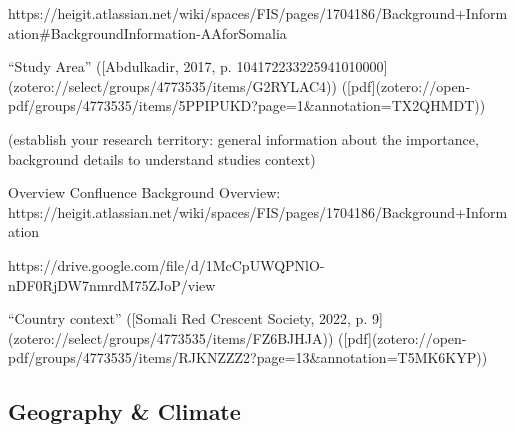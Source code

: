 {%

https://heigit.atlassian.net/wiki/spaces/FIS/pages/1704186/Background+Information#BackgroundInformation-AAforSomalia

“Study Area” ([Abdulkadir, 2017, p. 104172233225941010000](zotero://select/groups/4773535/items/G2RYLAC4)) ([pdf](zotero://open-pdf/groups/4773535/items/5PPIPUKD?page=1&annotation=TX2QHMDT))

(establish your research territory: general information about the importance, background details to understand studies context)

Overview Confluence Background Overview:
https://heigit.atlassian.net/wiki/spaces/FIS/pages/1704186/Background+Information

https://drive.google.com/file/d/1McCpUWQPNlO-nDF0RjDW7nmrdM75ZJoP/view

“Country context” ([Somali Red Crescent Society, 2022, p. 9](zotero://select/groups/4773535/items/FZ6BJHJA)) ([pdf](zotero://open-pdf/groups/4773535/items/RJKNZZZ2?page=13&annotation=T5MK6KYP))

\subsection{Geography & Climate}

}
